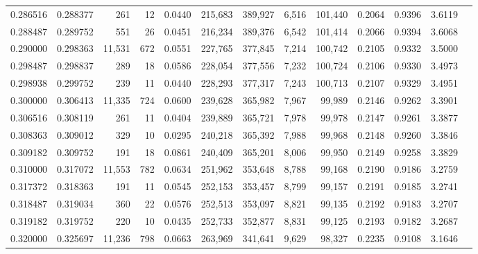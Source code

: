 \begin{tabular}{rrrrrrrrrrrrr}
0.286516 & 0.288377 &    261 &    12 &                                     0.0440 & 215,683 & 389,927 &   6,516 & 101,440 & 0.2064 & 0.9396 & 3.6119 \\
0.288487 & 0.289752 &    551 &    26 &                                     0.0451 & 216,234 & 389,376 &   6,542 & 101,414 & 0.2066 & 0.9394 & 3.6068 \\
0.290000 & 0.298363 & 11,531 &   672 &                                     0.0551 & 227,765 & 377,845 &   7,214 & 100,742 & 0.2105 & 0.9332 & 3.5000 \\
0.298487 & 0.298837 &    289 &    18 &                                     0.0586 & 228,054 & 377,556 &   7,232 & 100,724 & 0.2106 & 0.9330 & 3.4973 \\
0.298938 & 0.299752 &    239 &    11 &                                     0.0440 & 228,293 & 377,317 &   7,243 & 100,713 & 0.2107 & 0.9329 & 3.4951 \\
0.300000 & 0.306413 & 11,335 &   724 &                                     0.0600 & 239,628 & 365,982 &   7,967 &  99,989 & 0.2146 & 0.9262 & 3.3901 \\
0.306516 & 0.308119 &    261 &    11 &                                     0.0404 & 239,889 & 365,721 &   7,978 &  99,978 & 0.2147 & 0.9261 & 3.3877 \\
0.308363 & 0.309012 &    329 &    10 &                                     0.0295 & 240,218 & 365,392 &   7,988 &  99,968 & 0.2148 & 0.9260 & 3.3846 \\
0.309182 & 0.309752 &    191 &    18 &                                     0.0861 & 240,409 & 365,201 &   8,006 &  99,950 & 0.2149 & 0.9258 & 3.3829 \\
0.310000 & 0.317072 & 11,553 &   782 &                                     0.0634 & 251,962 & 353,648 &   8,788 &  99,168 & 0.2190 & 0.9186 & 3.2759 \\
0.317372 & 0.318363 &    191 &    11 &                                     0.0545 & 252,153 & 353,457 &   8,799 &  99,157 & 0.2191 & 0.9185 & 3.2741 \\
0.318487 & 0.319034 &    360 &    22 &                                     0.0576 & 252,513 & 353,097 &   8,821 &  99,135 & 0.2192 & 0.9183 & 3.2707 \\
0.319182 & 0.319752 &    220 &    10 &                                     0.0435 & 252,733 & 352,877 &   8,831 &  99,125 & 0.2193 & 0.9182 & 3.2687 \\
0.320000 & 0.325697 & 11,236 &   798 &                                     0.0663 & 263,969 & 341,641 &   9,629 &  98,327 & 0.2235 & 0.9108 & 3.1646 \\

\end{tabular}
